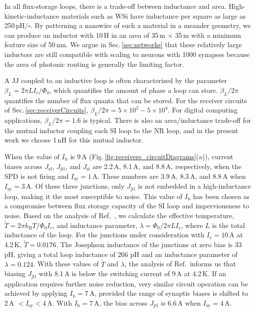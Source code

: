 \documentclass[twocolumn]{article}
\newcommand{\onlinecite}[1]{\hspace{-1 ex} \nocite{#1}\citenum{#1}}
\begin{document}
In all flux-storage loops, there is a trade-off between inductance and area. High-kinetic-inductance materials such as WSi have inductance per square as large as 250\,pH/$\square$. By patterning a nanowire of such a material in a meander geometry, we can produce an inductor with 10\,\textmu H in an area of 35\,\textmu m $\times$ 35\,\textmu m with a minimum feature size of 50\,nm. We argue in Sec.\,\ref{sec:networks} that these relatively large inductors are still compatible with scaling to neurons with 1000 synapses because the area of photonic routing is generally the limiting factor.

A JJ coupled to an inductive loop is often characterized by the parameter $\beta_L = 2\pi L I_c/\Phi_0$, which quantifies the amount of phase a loop can store. $\beta_L / 2\pi$ quantifies the number of flux quanta that can be stored. For the receiver circuits of Sec.\,\ref{sec:receiverCircuits}, $\beta_L/2\pi = 5\times10^2 - 5\times10^4$. For digital computing applications, $\beta_L/2\pi = 1.6$ is typical. There is also an area/inductance trade-off for the mutual inductor coupling each SI loop to the NR loop, and in the present work we choose 1\,nH for this mutual inductor.

When the value of $I_{\mathrm{b}}$ is 9\,\textmu A (Fig.\,\ref{fig:receivers_circuitDiagrams}(a)), current biases across $J_{\mathrm{sf}}$, $J_{\mathrm{jtl}}$, and $J_{\mathrm{si}}$ are 2.2\,\textmu A, 8.1\,\textmu A, and 8.8\,\textmu A, respectively, when the SPD is not firing and $I_{\mathrm{sy}} = 1$\,\textmu A. These numbers are 3.9\,\textmu A, 8.3\,\textmu A, and 8.8\,\textmu A when $I_{\mathrm{sy}} = 3$\,\textmu A. Of these three junctions, only $J_{\mathrm{jtl}}$ is not embedded in a high-inductance loop, making it the most susceptible to noise. This value of $I_{\mathrm{b}}$ has been chosen as a compromise between flux storage capacity of the SI loop and imperviousness to noise. Based on the analysis of Ref.\,\onlinecite{sesc2016}, we calculate the effective temperature, $\tilde{T} = 2\pi k_{\mathrm{B}} T/\Phi_0 I_c$, and inductance parameter, $\lambda = \Phi_0/2\pi LI_c$, where $L$ is the total inductance of the loop. For the junctions under consideration with $I_c = 10$\,\textmu A at 4.2\,K, $\tilde{T} = 0.0176$. The Josephson inductance of the junctions at zero bias is 33\,pH, giving a total loop inductance of 266 pH and an inductance parameter of $\lambda = 0.124$. With these values of $\tilde{T}$ and $\lambda$, the analysis of Ref.\,\onlinecite{sesc2016} informs us that biasing $J_{\mathrm{jtl}}$ with 8.1\,\textmu A is below the switching current of 9\,\textmu A at 4.2\,K. If an application requires further noise reduction, very similar circuit operation can be achieved by applying $I_{\mathrm{b}} = 7$\,\textmu A, provided the range of synaptic biases is shifted to 2\,\textmu A $< I_{\mathrm{sy}} < 4$\,\textmu A. With $I_{\mathrm{b}} = 7$\,\textmu A, the bias across $J_{\mathrm{jtl}}$ is 6.6\,\textmu A when $I_{\mathrm{sy}} = 4$\,\textmu A.
\end{document}
